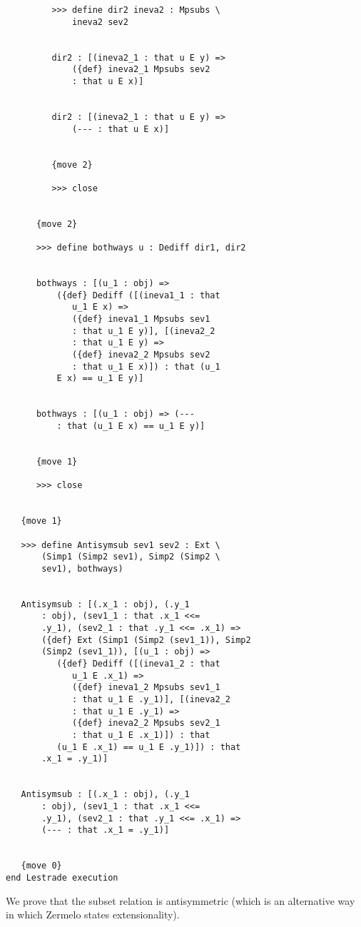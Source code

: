 \documentclass[12pt]{article}
\begin{document}
\begin{verbatim}
         >>> define dir2 ineva2 : Mpsubs \
             ineva2 sev2


         dir2 : [(ineva2_1 : that u E y) => 
             ({def} ineva2_1 Mpsubs sev2 
             : that u E x)]


         dir2 : [(ineva2_1 : that u E y) => 
             (--- : that u E x)]


         {move 2}

         >>> close


      {move 2}

      >>> define bothways u : Dediff dir1, dir2


      bothways : [(u_1 : obj) => 
          ({def} Dediff ([(ineva1_1 : that 
             u_1 E x) => 
             ({def} ineva1_1 Mpsubs sev1 
             : that u_1 E y)], [(ineva2_2 
             : that u_1 E y) => 
             ({def} ineva2_2 Mpsubs sev2 
             : that u_1 E x)]) : that (u_1 
          E x) == u_1 E y)]


      bothways : [(u_1 : obj) => (--- 
          : that (u_1 E x) == u_1 E y)]


      {move 1}

      >>> close


   {move 1}

   >>> define Antisymsub sev1 sev2 : Ext \
       (Simp1 (Simp2 sev1), Simp2 (Simp2 \
       sev1), bothways)


   Antisymsub : [(.x_1 : obj), (.y_1 
       : obj), (sev1_1 : that .x_1 <<= 
       .y_1), (sev2_1 : that .y_1 <<= .x_1) => 
       ({def} Ext (Simp1 (Simp2 (sev1_1)), Simp2 
       (Simp2 (sev1_1)), [(u_1 : obj) => 
          ({def} Dediff ([(ineva1_2 : that 
             u_1 E .x_1) => 
             ({def} ineva1_2 Mpsubs sev1_1 
             : that u_1 E .y_1)], [(ineva2_2 
             : that u_1 E .y_1) => 
             ({def} ineva2_2 Mpsubs sev2_1 
             : that u_1 E .x_1)]) : that 
          (u_1 E .x_1) == u_1 E .y_1)]) : that 
       .x_1 = .y_1)]


   Antisymsub : [(.x_1 : obj), (.y_1 
       : obj), (sev1_1 : that .x_1 <<= 
       .y_1), (sev2_1 : that .y_1 <<= .x_1) => 
       (--- : that .x_1 = .y_1)]


   {move 0}
end Lestrade execution
\end{verbatim}

We prove that the subset relation is antisymmetric (which is an alternative way in which Zermelo states extensionality).
\end{document}
